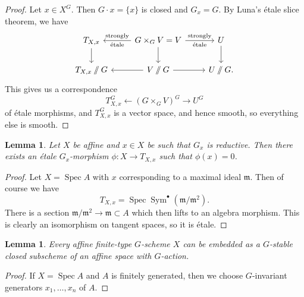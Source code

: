 \documentclass{amsart}
\newtheorem{lem}[thm]{Lemma}
\theoremstyle{definition}
\theoremstyle{remark}
\theoremstyle{plain}
\theoremstyle{definition}
\theoremstyle{remark}
\newcommand{\mf}[1]{\mathfrak{#1}}
\newcommand{\on}[1]{\operatorname{#1}}
\newcommand{\1}{\mathbf{1}}
\newcommand{\2}{\mathbf{2}}
\newcommand{\3}{\mathbf{3}}
\DeclareMathOperator{\Spec}{Spec}
\begin{document}
\begin{proof}
    Let \(x \in X^G\). Then \(G \cdot x = \{x\}\) is closed and \(G_x = G\). By Luna's \'etale slice theorem, we have
    \begin{equation*}
    \begin{tikzcd}
        T_{X,x} \ar{d} & G \times_G V = V \ar{l}{\text{\'etale}}[swap]{\text{strongly}} \ar{d} \ar{r}{\text{strongly}}[swap]{\text{\'etale}} & U \ar{d} \\
        T_{X,x} \sslash G & V \sslash G \ar{l} \ar{r} & U \sslash G.
    \end{tikzcd}
    \end{equation*}
    This gives us a correspondence
    \[ T_{X,x}^G \gets (G \times_G V)^G \to U^G \]
    of \'etale morphisms, and \(T_{X,x}^G\) is a vector space, and hence smooth, so everything else is smooth.
\end{proof}

\begin{lem}\label{lem:etale-to-tangent-space}
    Let \(X\) be affine and \(x \in X\) be such that \(G_x\) is reductive. Then there exists an \'etale \(G_x\)-morphism \(\phi \colon X \to T_{X,x}\) such that \(\phi(x) = 0\).
\end{lem}

\begin{proof}
    Let \(X = \Spec A\) with \(x\) corresponding to a maximal ideal \(\mf{m}\). Then of course we have
    \[ T_{X,x} = \Spec \on{Sym}^{\bullet} (\mf{m}/\mf{m}^2). \]
    There is a section \(\mf{m}/\mf{m}^2 \to \mf{m} \subset A\) which then lifts to an algebra morphism. This is clearly an isomorphism on tangent spaces, so it is \'etale.
\end{proof}

\begin{lem}\label{lem:embedding-into-affine-space}
    Every affine finite-type \(G\)-scheme \(X\) can be embedded as a \(G\)-stable closed subscheme of an affine space with \(G\)-action.
\end{lem}

\begin{proof}
    If \(X = \Spec A\) and \(A\) is finitely generated, then we choose \(G\)-invariant generators \(x_1, \ldots, x_n\) of \(A\).
\end{proof}
\end{document}
